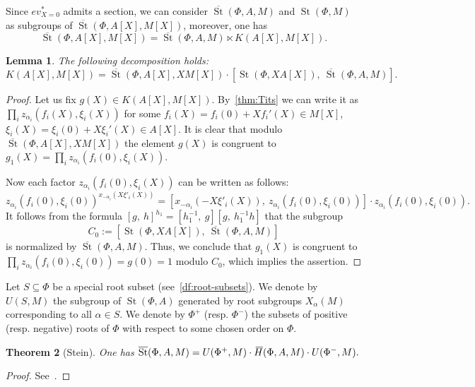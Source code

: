 \documentclass[oneside, 8pt]{amsart}
\newtheorem{lemma}{Lemma}
\newtheorem{externaltheorem}[lemma]{Theorem}
\theoremstyle{remark}
\theoremstyle{definition}
\numberwithin{lemma}{section}
\numberwithin{prop}{section}
\numberwithin{corollary}{section}
\numberwithin{externaltheorem}{section}
\DeclareMathOperator{\St}{St}
\newcommand{\myol}[2][3]{{}\mkern#1mu\overline{\mkern-#1mu#2}}
\numberwithin{equation}{section}
\begin{document}
Since $ev_{X=0}^*$ admits a section, we can consider $\overline{\St}(\Phi, A, M)$ and $\St(\Phi, M)$ as subgroups of $\overline{\St}(\Phi, A[X], M[X])$,
 moreover, one has 
\begin{equation} \label{eq:sd-decomp} \overline{\St}(\Phi, A[X], M[X]) = \overline{\St}(\Phi, A, M) \ltimes K(A[X], M[X]).\end{equation}
\begin{lemma} \label{Kdecomp1} The following decomposition holds:
 \[ K(A[X], M[X]) = \overline{\St}(\Phi, A[X], XM[X]) \cdot \left[\St(\Phi, XA[X]),\ \overline{\St}(\Phi, A, M)\right].\] \end{lemma}
\begin{proof} Let us fix $g(X) \in K(A[X], M[X])$. By~\cref{thm:Tits} we can write it as $\prod_i z_{\alpha_i}(f_i(X), \xi_i(X))$ for some $f_i(X) = f_i(0) + Xf_i'(X) \in M[X]$, $\xi_i(X) = \xi_i(0) + X\xi_i'(X) \in A[X]$.
 It is clear that modulo $\overline{\St}(\Phi, A[X], XM[X])$ the element $g(X)$ is congruent to $g_1(X) = \prod_i z_{\alpha_i}(f_i(0), \xi_i(X)).$ 
 
 Now each factor $z_{\alpha_i}(f_i(0), \xi_i(X))$ can be written as follows:
 \[z_{\alpha_i}(f_i(0), \xi_i(0))^{x_{-\alpha_i}(X\xi'_i(X))} = [x_{-\alpha_i}(-X\xi'_i(X)),\ z_{\alpha_i}(f_i(0), \xi_i(0))] \cdot z_{\alpha_i}(f_i(0), \xi_i(0)).\]
 It follows from the formula $[g,\ h]^{h_1} = [h_1^{-1},\ g][g,\ h_1^{-1}h]$ that the subgroup \[C_0 := \left[\St(\Phi, XA[X]),\ \overline{\St}(\Phi, A, M)\right]\] is normalized by $\overline{\St}(\Phi, A, M)$. Thus, we conclude that $g_1(X)$ is congruent to $\prod_i z_{\alpha_i}(f_i(0), \xi_i(0)) = g(0) = 1$ modulo $C_0$,
 which implies the assertion. \qedhere \end{proof}

Let $S \subseteq \Phi$ be a special root subset (see~\cref{df:root-subsets}). We denote by $U(S, M)$ the subgroup of $\St(\Phi, A)$ generated by root subgroups $X_\alpha(M)$ corresponding to all $\alpha \in S$. We denote by $\Phi^+$ (resp. $\Phi^-$) the subsets of positive (resp. negative) roots of $\Phi$ with respect to some chosen order on $\Phi$.
 
\begin{externaltheorem}[Stein] \label{thm:Stein} One has $\overline{\St}(\Phi, A, M) = U(\Phi^+, M) \cdot \myol{H}(\Phi, A, M) \cdot U(\Phi^-, M).$ \end{externaltheorem} \begin{proof} See~\cite[Theorem~2.4]{Ste73}. \end{proof}
\end{document}

